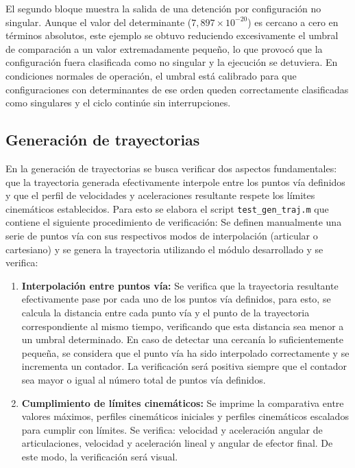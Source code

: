 \documentclass{article}
\begin{document}
\begin{appendices}
\begin{lstlisting}[style=Matlab-editor, basicstyle=\small\ttfamily]
\end{lstlisting}

El segundo bloque muestra la salida de una detención por configuración no singular. Aunque el valor del determinante ($7{,}897 \times 10^{-20}$) es cercano a cero en términos absolutos, este ejemplo se obtuvo reduciendo excesivamente el umbral de comparación a un valor extremadamente pequeño, lo que provocó que la configuración fuera clasificada como no singular y la ejecución se detuviera. En condiciones normales de operación, el umbral está calibrado para que configuraciones con determinantes de ese orden queden correctamente clasificadas como singulares y el ciclo continúe sin interrupciones.
 
\subsection{Generación de trayectorias}
\label{ap:generacion_trayectorias}

En la generación de trayectorias se busca verificar dos aspectos fundamentales: que la trayectoria generada efectivamente interpole entre los puntos vía definidos y que el perfil de velocidades y aceleraciones resultante respete los límites cinemáticos establecidos. Para esto se elabora el script \colorbox{gray!20}{\texttt{test\_gen\_traj.m}} que contiene el siguiente procedimiento de verificación:
Se definen manualmente una serie de puntos vía con sus respectivos modos de interpolación (articular o cartesiano) y se genera la trayectoria utilizando el módulo desarrollado y se verifica:
\begin{enumerate}
    \item \textbf{Interpolación entre puntos vía:}  Se verifica que la trayectoria resultante efectivamente pase por cada uno de los puntos vía definidos, para esto, se calcula la distancia entre cada punto vía y el punto de la trayectoria correspondiente al mismo tiempo, verificando que esta distancia sea menor a un umbral determinado. En caso de detectar una cercanía lo suficientemente pequeña, se considera que el punto vía ha sido interpolado correctamente y se incrementa un contador. La verificación será positiva siempre que el contador sea mayor o igual al número total de puntos vía definidos.
    \item \textbf{Cumplimiento de límites cinemáticos:} Se imprime la comparativa entre valores máximos, perfiles cinemáticos iniciales y perfiles cinemáticos escalados para cumplir con límites. Se verifica: velocidad y aceleración angular de articulaciones, velocidad y aceleración lineal y angular de efector final. De este modo, la verificación será visual.
\end{enumerate}


\end{appendices}
\end{document}
